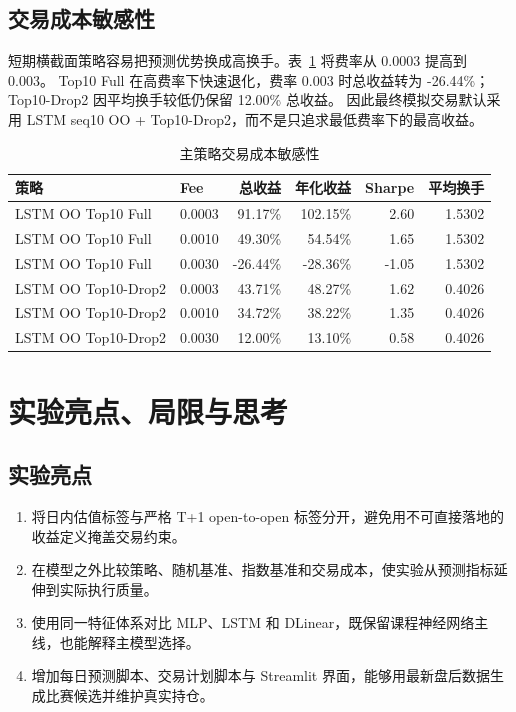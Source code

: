 \documentclass[UTF8,a4paper,11pt]{ctexart}
\begin{document}
\subsection{交易成本敏感性}

短期横截面策略容易把预测优势换成高换手。表~\ref{tab:fee} 将费率从 0.0003 提高到 0.003。
Top10 Full 在高费率下快速退化，费率 0.003 时总收益转为 -26.44\%；
Top10-Drop2 因平均换手较低仍保留 12.00\% 总收益。
因此最终模拟交易默认采用 LSTM seq10 OO + Top10-Drop2，而不是只追求最低费率下的最高收益。

\begin{table}[H]
\centering
\caption{主策略交易成本敏感性}\label{tab:fee}
\begin{tabular}{llrrrr}
\toprule
策略 & Fee & 总收益 & 年化收益 & Sharpe & 平均换手 \\
\midrule
LSTM OO Top10 Full & 0.0003 & 91.17\% & 102.15\% & 2.60 & 1.5302 \\
LSTM OO Top10 Full & 0.0010 & 49.30\% & 54.54\% & 1.65 & 1.5302 \\
LSTM OO Top10 Full & 0.0030 & -26.44\% & -28.36\% & -1.05 & 1.5302 \\
LSTM OO Top10-Drop2 & 0.0003 & 43.71\% & 48.27\% & 1.62 & 0.4026 \\
LSTM OO Top10-Drop2 & 0.0010 & 34.72\% & 38.22\% & 1.35 & 0.4026 \\
LSTM OO Top10-Drop2 & 0.0030 & 12.00\% & 13.10\% & 0.58 & 0.4026 \\
\bottomrule
\end{tabular}
\end{table}

\section{实验亮点、局限与思考}

\subsection{实验亮点}

\begin{enumerate}
  \item 将日内估值标签与严格 T+1 open-to-open 标签分开，避免用不可直接落地的收益定义掩盖交易约束。
  \item 在模型之外比较策略、随机基准、指数基准和交易成本，使实验从预测指标延伸到实际执行质量。
  \item 使用同一特征体系对比 MLP、LSTM 和 DLinear，既保留课程神经网络主线，也能解释主模型选择。
  \item 增加每日预测脚本、交易计划脚本与 Streamlit 界面，能够用最新盘后数据生成比赛候选并维护真实持仓。
\end{enumerate}
\end{document}
